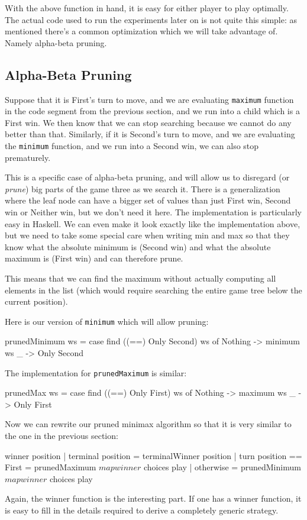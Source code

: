 With the above function in hand, it is easy for either player to play optimally.
The actual code used to run the experiments later on is not quite this simple: as mentioned there's a common optimization which we will take advantage of.
Namely alpha-beta pruning.

\subsection {Alpha-Beta Pruning}

Suppose that it is First's turn to move, and we are evaluating \texttt{maximum} function in the code segment from the previous section, and we run into a child which is a First win.
We then know that we can stop searching because we cannot do any better than that.
Similarly, if it is Second's turn to move, and we are evaluating the \texttt{minimum} function, and we run into a Second win, we can also stop prematurely.

This is a specific case of alpha-beta pruning, and will allow us to disregard (or \emph{prune}) big parts of the game three as we search it.
There is a generalization where the leaf node can have a bigger set of values than just First win, Second win or Neither win, but we don't need it here.
The implementation is particularly easy in Haskell. We can even make it look exactly like the implementation above, but we need to take some special care when writing min and max so that they know what the absolute minimum is (Second win) and what the absolute maximum is (First win) and can therefore prune.

This means that we can find the maximum without actually computing all elements in the list (which would require searching the entire game tree below the current position).

Here is our version of \texttt{minimum} which will allow pruning:
\begin{code}
  prunedMinimum ws = 
    case find ((==) Only Second) ws of
      Nothing -> minimum ws
      _ -> Only Second
\end{code}
The implementation for \texttt{prunedMaximum} is similar:
\begin{code}
  prunedMax ws = 
    case find ((==) Only First) ws of
      Nothing -> maximum ws
      _ -> Only First
\end{code}
Now we can rewrite our pruned minimax algorithm so that it is very similar to the one in the previous section:
\begin{code}
  winner position
    | terminal position       = terminalWinner position
    | turn position == First  = prunedMaximum $ map winner $ choices play
    | otherwise               = prunedMinimum $ map winner $ choices play
\end{code}
Again, the winner function is the interesting part. If one has a winner function, it is easy to fill in the details required to derive a completely generic strategy.


